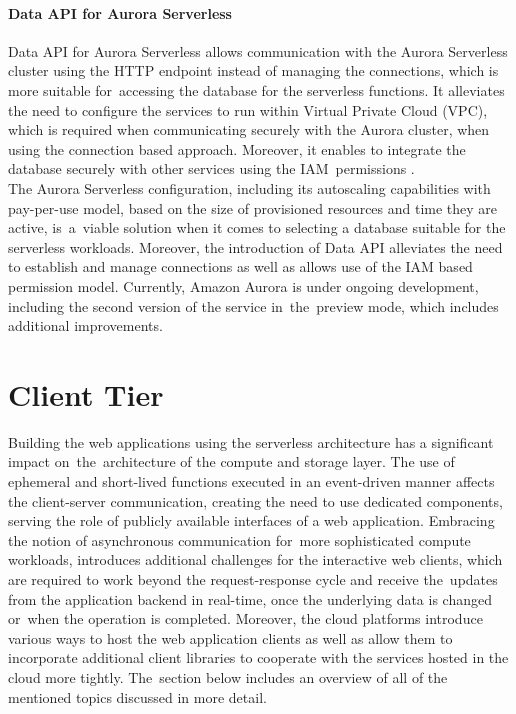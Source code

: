 \paragraph{Data API for Aurora Serverless}

Data API for Aurora Serverless allows communication with the Aurora Serverless cluster using the HTTP endpoint instead of managing the connections, which is more suitable for~accessing the database for the serverless functions.
It alleviates the need to configure the services to run within Virtual Private Cloud (VPC), which is required when communicating securely with the Aurora cluster, when using the connection based approach.
Moreover, it enables to integrate the database securely with other services using the IAM~permissions \cite{AuroraServerlessDataAPI}. \\

The Aurora Serverless configuration, including its autoscaling capabilities with pay-per-use model, based on the size of provisioned resources and time they are active, is~a~viable solution when it comes to selecting a database suitable for the serverless workloads.
Moreover, the introduction of Data API alleviates the need to establish and manage connections as well as allows use of the IAM based permission model.
Currently, Amazon Aurora is under ongoing development, including the second version of the service in~the~preview mode, which includes additional improvements.

\section{Client Tier}

Building the web applications using the serverless architecture has a significant impact on~the~architecture of the compute and storage layer.
The use of ephemeral and short-lived functions executed in an event-driven manner affects the client-server communication, creating the need to use dedicated components, serving the role of publicly available interfaces of a web application.
Embracing the notion of asynchronous communication for~more sophisticated compute workloads, introduces additional challenges for the interactive web clients, which are required to work beyond the request-response cycle and receive the~updates from the application backend in real-time, once the underlying data is changed or~when the operation is completed.
Moreover, the cloud platforms introduce various ways to host the web application clients as well as allow them to incorporate additional client libraries to cooperate with the services hosted in the cloud more tightly.
The~section below includes an overview of all of the mentioned topics discussed in more detail.

